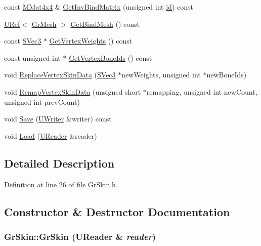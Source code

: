 \begin{CompactItemize}
\item 
const \hyperlink{class_m_mat4x4}{MMat4x4} \& \hyperlink{class_gr_skin_028df15246d94a33ec7fac21d8bfb126}{GetInvBindMatrix} (unsigned int \hyperlink{glext__bak_8h_58c2a664503e14ffb8f21012aabff3e9}{id}) const 
\item 
\hyperlink{class_u_ref}{URef}$<$ \hyperlink{class_gr_mesh}{GrMesh} $>$ \hyperlink{class_gr_skin_b914ebe591236b914e3f1bc6ebdb9cd4}{GetBindMesh} () const 
\item 
const \hyperlink{struct_s_vec3}{SVec3} $\ast$ \hyperlink{class_gr_skin_abc63a0ed0091701f1cb8ceea66bbd11}{GetVertexWeights} () const 
\item 
const unsigned int $\ast$ \hyperlink{class_gr_skin_5ca027b19b338d5b1357686497d780a0}{GetVertexBoneIds} () const 
\item 
void \hyperlink{class_gr_skin_ffef9a16b667c75cf91f2b3850b1421a}{ReplaceVertexSkinData} (\hyperlink{struct_s_vec3}{SVec3} $\ast$newWeights, unsigned int $\ast$newBoneIds)
\item 
void \hyperlink{class_gr_skin_9f7c0397243a62abb74590a6fa0d6bc0}{RemapVertexSkinData} (unsigned short $\ast$remapping, unsigned int newCount, unsigned int prevCount)
\item 
void \hyperlink{class_gr_skin_4aa56f5dcc36289d344a2e2dc9ee98e8}{Save} (\hyperlink{class_u_writer}{UWriter} \&writer) const 
\item 
void \hyperlink{class_gr_skin_317090211672b8425cd5b1494eabffdd}{Load} (\hyperlink{class_u_reader}{UReader} \&reader)
\end{CompactItemize}


\subsection{Detailed Description}


Definition at line 26 of file GrSkin.h.

\subsection{Constructor \& Destructor Documentation}
\hypertarget{class_gr_skin_a262f1da9afc382b7ce617ed6aaea61d}{
\subsubsection[{GrSkin}]{\setlength{\rightskip}{0pt plus 5cm}GrSkin::GrSkin ({\bf UReader} \& {\em reader})}}
\label{class_gr_skin_a262f1da9afc382b7ce617ed6aaea61d}





